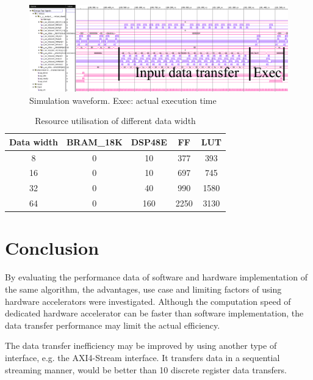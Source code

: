 \documentclass[journal]{IEEEtran}
\begin{document}
\begin{figure}[!t]
	\centering
	\includegraphics[width=\textwidth]{sim}
	\caption{Simulation waveform. Exec: actual execution time}
	\label{fig:sim}
\end{figure}



\begin{table}[!ht]
	\renewcommand{\arraystretch}{1.3}
	\caption{Resource utilisation of different data width}
	\label{tbl:reswidth}
	\centering
	\begin{tabular}{ccccc}
		\hline
		Data width	& BRAM\_18K	& DSP48E	& FF	& LUT	\\
		\hline
		8	& 0	& 10	& 377	& 393	\\
		16	& 0	& 10	& 697	& 745	\\
		32	& 0	& 40	& 990	& 1580	\\
		64	& 0	& 160	& 2250	& 3130	\\
		\hline
	\end{tabular}
\end{table}

\fi

\section{Conclusion}

By evaluating the performance data of software and hardware implementation of the same algorithm, the advantages, use case and limiting factors of using hardware accelerators were investigated. Although the computation speed of dedicated hardware accelerator can be faster than software implementation, the data transfer performance may limit the actual efficiency.

The data transfer inefficiency may be improved by using another type of interface, e.g. the AXI4-Stream interface. It transfers data in a sequential streaming manner, would be better than 10 discrete register data transfers.




\end{document}
